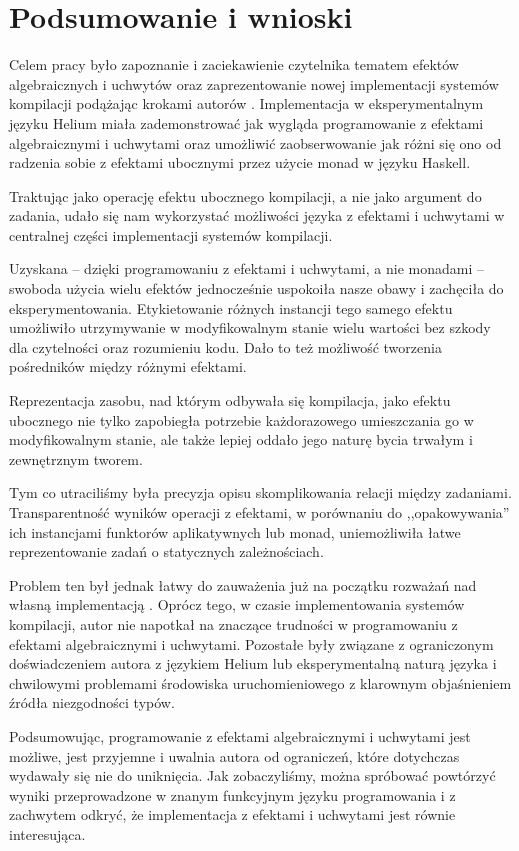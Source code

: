 
\chapter{Podsumowanie i wnioski}

Celem pracy było zapoznanie i zaciekawienie czytelnika tematem efektów algebraicznych i uchwytów oraz zaprezentowanie nowej implementacji systemów kompilacji podążając krokami autorów \BSaLC{}. Implementacja w eksperymentalnym języku Helium miała zademonstrować jak wygląda programowanie z efektami algebraicznymi i uchwytami oraz umożliwić zaobserwowanie jak różni się ono od radzenia sobie z efektami ubocznymi przez użycie monad w języku Haskell.

Traktując  jako operację efektu ubocznego kompilacji, a nie jako argument do zadania, udało się nam wykorzystać możliwości języka z efektami i uchwytami w centralnej części implementacji systemów kompilacji.

Uzyskana -- dzięki programowaniu z efektami i uchwytami, a nie monadami -- swoboda użycia wielu efektów jednocześnie uspokoiła nasze obawy i zachęciła do eksperymentowania. Etykietowanie różnych instancji tego samego efektu umożliwiło utrzymywanie w modyfikowalnym stanie wielu wartości bez szkody dla czytelności oraz rozumieniu kodu. Dało to też możliwość tworzenia pośredników między różnymi efektami. %

Reprezentacja zasobu, nad którym odbywała się kompilacja, jako efektu ubocznego nie tylko zapobiegła potrzebie każdorazowego umieszczania go w modyfikowalnym stanie, ale także lepiej oddało jego naturę bycia trwałym i zewnętrznym tworem.

Tym co utraciliśmy była precyzja opisu skomplikowania relacji między zadaniami. Transparentność wyników operacji z efektami, w porównaniu do ,,opakowywania'' ich instancjami funktorów aplikatywnych lub monad, uniemożliwiła łatwe reprezentowanie zadań o statycznych zależnościach.

Problem ten był jednak łatwy do zauważenia już na początku rozważań nad własną implementacją \BSaLC{}. Oprócz tego, w czasie implementowania systemów kompilacji, autor nie napotkał na znaczące trudności w programowaniu z efektami algebraicznymi i uchwytami. Pozostałe były związane z ograniczonym doświadczeniem autora z językiem Helium lub eksperymentalną naturą języka i chwilowymi problemami środowiska uruchomieniowego z klarownym objaśnieniem źródła niezgodności typów.

Podsumowując, programowanie z efektami algebraicznymi i uchwytami jest możliwe, jest przyjemne i uwalnia autora od ograniczeń, które dotychczas wydawały się nie do uniknięcia. Jak zobaczyliśmy, można spróbować powtórzyć wyniki przeprowadzone w znanym funkcyjnym języku programowania i z zachwytem odkryć, że implementacja z efektami i uchwytami jest równie interesująca.
